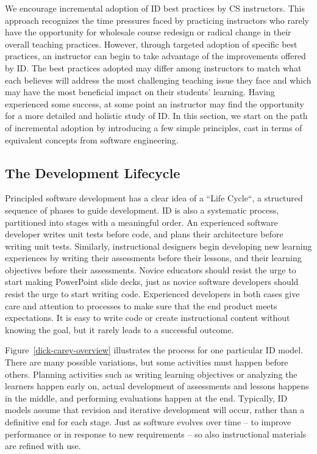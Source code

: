 We encourage incremental adoption of ID best practices by CS instructors.
This approach recognizes the time pressures faced by practicing instructors who rarely have the opportunity for wholesale course redesign or radical change in their overall teaching practices.
However, through targeted adoption of specific best practices, an instructor can begin to take advantage of the improvements offered by ID.
The best practices adopted may differ among instructors to match what each believes will address the most challenging teaching issue they face and which may have the most beneficial impact on their students' learning.
Having experienced some success, at some point an instructor may find the opportunity for a more detailed and holistic study of ID.
In this section, we start on the path of incremental adoption by introducing a few simple principles, cast in terms of equivalent concepts from software engineering.  


\subsection{The Development Lifecycle}

Principled software development has a clear idea of a ``Life Cycle``, a structured sequence of phases to guide development.
ID is also a systematic process, partitioned into stages with a meaningful order.
An experienced software developer writes unit tests before code, and plans their architecture before writing unit tests.
Similarly, instructional designers begin developing new learning experiences by writing their assessments before their lessons, and their learning objectives before their assessments.
Novice educators should resist the urge to start making PowerPoint slide decks, just as novice software developers should resist the urge to start writing code.
Experienced developers in both cases give care and attention to processes to make sure that the end product meets expectations.
It is easy to write code or create instructional content without knowing the goal, but it rarely leads to a successful outcome.

Figure~\ref{dick-carey-overview} illustrates the process for one particular ID model.
There are many possible variations, but some activities must happen before others.
Planning activities such as writing learning objectives or analyzing the learners happen early on, actual development of assessments and lessons happens in the middle, and performing evaluations happen at the end.
Typically, ID models assume that revision and iterative development will occur, rather than a definitive end for each stage.
Just as software evolves over time -- to improve performance or in response to new requirements -- so also instructional materials are refined with use.

